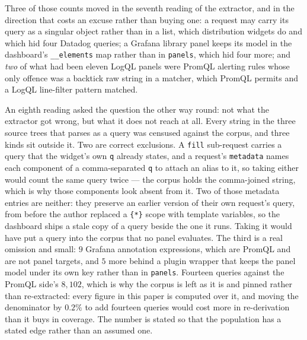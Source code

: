 \begin{remark}\label{rem:extraction-fixes}
Three of those counts moved in the seventh reading of the extractor, and in the direction
that costs an excuse rather than buying one: a request may carry its query as a singular
object rather than in a list, which distribution widgets do and which hid four Datadog
queries; a Grafana library panel keeps its model in the dashboard's \texttt{\_\_elements}
map rather than in \texttt{panels}, which hid four more; and \emph{two} of what had been
eleven LogQL panels were PromQL alerting rules whose only offence was a backtick raw
string in a matcher, which PromQL permits and a LogQL line-filter pattern matched.

An eighth reading asked the question the other way round: not what the extractor got
wrong, but what it does not reach at all. Every string in the three source trees that
parses as a query was censused against the corpus, and three kinds sit outside it. Two
are correct exclusions. A \texttt{fill} sub-request carries a query that the widget's
own \texttt{q} already states, and a request's \texttt{metadata} names each component of
a comma-separated \texttt{q} to attach an alias to it, so taking either would count the
same query twice --- the corpus holds the comma-joined string, which is why those
components look absent from it. Two of those metadata entries are neither: they preserve
an earlier version of their own request's query, from before the author replaced a
\texttt{\{*\}} scope with template variables, so the dashboard ships a stale copy of a
query beside the one it runs. Taking it would have put a query into the corpus that no
panel evaluates. The third is a real omission and small: $9$ Grafana
annotation expressions, which are PromQL and are not panel targets, and $5$ more behind
a plugin wrapper that keeps the panel model under its own key rather than in
\texttt{panels}. Fourteen queries against the PromQL side's $8{,}102$, which is why the
corpus is left as it is and pinned rather than re-extracted: every figure in this paper
is computed over it, and moving the denominator by $0.2\%$ to add fourteen queries
would cost more in re-derivation than it buys in coverage. The number is stated so that
the population has a stated edge rather than an assumed one.
\end{remark}
